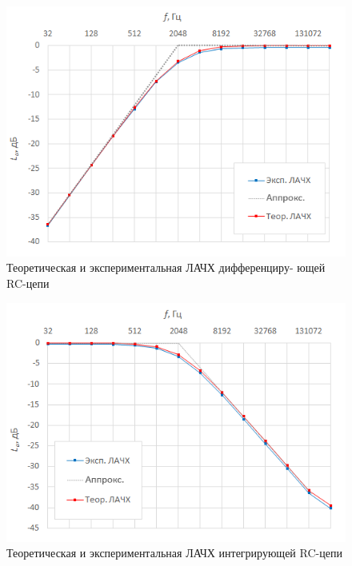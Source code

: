 \setlength{\abovecaptionskip}{0pt}
\setlength{\belowcaptionskip}{-50pt} %
\begin{figure}[H]
	\begin{center}
		\includegraphics[width=15cm]{img/1}
		\caption{Теоретическая и экспериментальная ЛАЧХ дифференциру-
ющей RC-цепи
} 
		\label{t:e1} %
	\end{center}
\end{figure}

\begin{figure}[H]
	\begin{center}
		\includegraphics[width=15cm]{img/2}
		\caption{Теоретическая и экспериментальная ЛАЧХ интегрирующей
RC-цепи} 
		\label{t:e2} %
	\end{center}
\end{figure}

